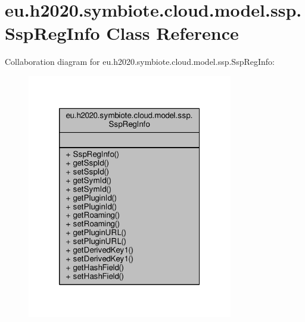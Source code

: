 \hypertarget{classeu_1_1h2020_1_1symbiote_1_1cloud_1_1model_1_1ssp_1_1SspRegInfo}{}\section{eu.\+h2020.\+symbiote.\+cloud.\+model.\+ssp.\+Ssp\+Reg\+Info Class Reference}
\label{classeu_1_1h2020_1_1symbiote_1_1cloud_1_1model_1_1ssp_1_1SspRegInfo}


Collaboration diagram for eu.\+h2020.\+symbiote.\+cloud.\+model.\+ssp.\+Ssp\+Reg\+Info\+:\nopagebreak
\begin{figure}[H]
\begin{center}
\leavevmode
\includegraphics[width=254pt]{classeu_1_1h2020_1_1symbiote_1_1cloud_1_1model_1_1ssp_1_1SspRegInfo__coll__graph}
\end{center}
\end{figure}
